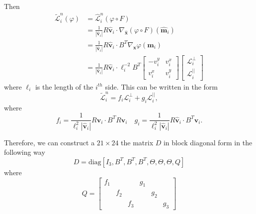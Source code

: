 Then
\begin{align*}
  \tilde{\mathcal{L}}^n_i(\varphi) &= \hat{\mathcal{L}}^n_i(\varphi\circ F) \\
  &= \frac{1}{|\hat{\mathbf{v}}_i|}R \hat{\mathbf{v}}_i \cdot
    \nabla_{\hat{\mathbf{x}}}(\varphi \circ F)(\hat{\mathbf{m}}_i) \\
  &= \frac{1}{|\hat{\mathbf{v}}_i|}R \hat{\mathbf{v}}_i \cdot B^T
    \nabla_{\mathbf{x}} \varphi(\mathbf{m}_i) \\
  &= \frac{1}{|\hat{\mathbf{v}}_i|}R \hat{\mathbf{v}}_i \cdot \ell_i^{-2} B^T
  \begin{bmatrix} -v^y_i & v^x_i \\ v^x_i & v^y_i \end{bmatrix}
  \begin{bmatrix}
    \mathcal{L}^{\perp}_i \\ \mathcal{L}^{||}_i
  \end{bmatrix}
\end{align*}
where $\ell_i$ is the length of the $i^{th}$ side. This can be written in the form
\begin{equation*}
  \tilde{\mathcal{L}}_i^n = f_i \mathcal{L}^{\perp}_i + g_i \mathcal{L}^{||}_i,
\end{equation*}
where
\begin{equation*}
  f_i = \frac{1}{\ell_i^2 |\hat{\mathbf{v}}_i|}R \hat{\mathbf{v}}_i \cdot B^T
    R\mathbf{v}_i \quad
  g_i = \frac{1}{\ell_i^2 |\hat{\mathbf{v}}_i|}R \hat{\mathbf{v}}_i \cdot B^T
    \mathbf{v}_i .
\end{equation*}

Therefore, we can construct a $21\times 24$ the matrix $D$ in block diagonal
form in the following way
\begin{equation*}
  D = \text{diag}[I_3, B^T, B^T, B^T, \Theta, \Theta, \Theta, Q]
\end{equation*}
where
\begin{equation*}
  Q = \left[\begin{array}{ccc|ccc}
    f_1 & & & g_1 & & \\
    & f_2 & & & g_2 &\\
    & & f_3 & & & g_3
  \end{array}\right]
\end{equation*}

